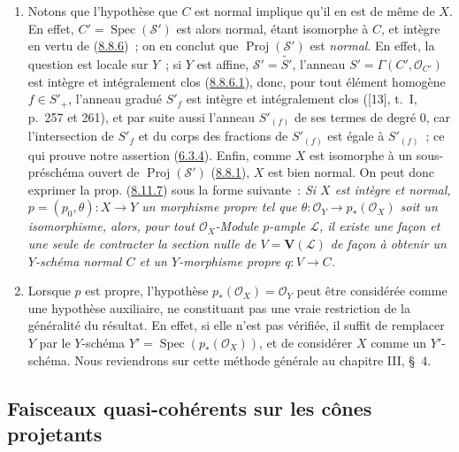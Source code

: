 \begin{remark}[8.11.8]
\label{II.8.11.8-fr}
\begin{enumerate}
  \item[\rm{(i)}] Notons que l'hypothèse que $C$ est normal implique qu'il en
  est de même de $X$. En effet, $C'=\operatorname{Spec}(\mathcal{S}')$ est
  alors normal, étant isomorphe à $C$, et intègre en vertu de
  (\hyperref[II.8.8.6-fr]{8.8.6})~; on en conclut que
  $\operatorname{Proj}(\mathcal{S}')$ est \emph{normal}. En effet, la question
  est locale sur $Y$~; si $Y$ est affine, $\mathcal{S}'=\widetilde{S'}$,
  l'anneau $S'=\Gamma(C',\mathcal{O}_{C'})$ est intègre et intégralement clos
  (\hyperref[II.8.8.6.1-fr]{8.8.6.1}), donc, pour tout élément homogène
  $f\in S'_+$, l'anneau gradué $S'_f$ est intègre et intégralement clos
  ([13], t.~I, p.~257 et 261), et par suite aussi l'anneau $S'_{(f)}$ de ses
  termes de degré 0, car l'intersection de $S'_f$ et du corps des fractions de
  $S'_{(f)}$ est égale à $S'_{(f)}$~; ce qui prouve notre assertion
  (\hyperref[II.6.3.4-fr]{6.3.4}). Enfin, comme $X$ est isomorphe à un
  sous-préschéma ouvert de $\operatorname{Proj}(\mathcal{S}')$
  (\hyperref[II.8.8.1-fr]{8.8.1}), $X$ est bien normal. On peut donc exprimer
  la prop. (\hyperref[II.8.11.7-fr]{8.11.7}) sous la forme suivante~:
  \emph{Si $X$ est intègre et normal,
  $p=(p_0,\theta):X\to Y$ un morphisme propre tel que
  $\theta:\mathcal{O}_Y\to p_*(\mathcal{O}_X)$ soit un isomorphisme, alors,
  pour tout $\mathcal{O}_X$-Module $p$-ample $\mathcal{L}$, il existe une
  façon et une seule de contracter la section nulle de
  $V=\mathbf{V}(\mathcal{L})$ de façon à obtenir un $Y$-schéma normal $C$ et
  un $Y$-morphisme propre $q:V\to C$.}
  \item[\rm{(ii)}] Lorsque $p$ est propre, l'hypothèse
  $p_*(\mathcal{O}_X)=\mathcal{O}_Y$ peut être considérée comme une hypothèse
  auxiliaire, ne constituant pas une vraie restriction de la généralité du
  résultat. En effet, si elle n'est pas vérifiée, il suffit de remplacer $Y$
  par le $Y$-schéma
  $Y'=\operatorname{Spec}(p_*(\mathcal{O}_X))$, et de considérer $X$ comme un
  $Y'$-schéma. Nous reviendrons sur cette méthode générale au chapitre III,
  \S~4.
\end{enumerate}
\end{remark}
\subsection{Faisceaux quasi-cohérents sur les cônes projetants}
\label{subsection:II.8.12-fr}

